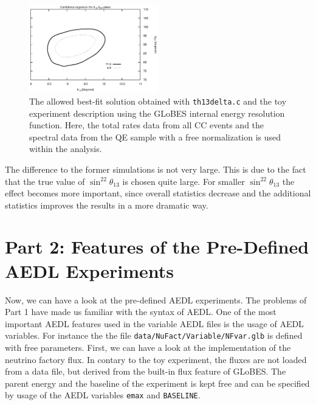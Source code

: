 \documentclass[12pt,a4paper]{article}
\theoremstyle{dotless}
\begin{document}
\begin{figure}[h!]
  \begin{center}
    \includegraphics[width=0.5\textwidth]{CCtotal.eps}   
      \end{center}
  \vspace{-0.7 cm}
  \caption{\small The allowed best-fit solution obtained with {\tt th13delta.c}
  and the toy experiment description using the GLoBES internal energy resolution function.
  Here, the total rates data from all CC events and the spectral data from the QE sample
  with a free normalization is used within the analysis.}
  \label{fig:total}
\end{figure}

The difference to the former simulations is not very large. This is due to the fact that
the true value of $\sin^22\theta_{13}$ is chosen quite large. For smaller $\sin^22\theta_{13}$
the effect becomes more important, since overall statistics decrease and the additional statistics
improves the results in a more dramatic way.

\section*{Part 2: Features of the Pre-Defined AEDL Experiments}

Now, we can have a look at the pre-defined AEDL experiments. The problems of
Part 1 have made us familiar with the syntax of AEDL. One of the most important
AEDL features used in the variable AEDL files is the usage of AEDL variables.
For instance the the file {\tt data/NuFact/Variable/NFvar.glb} is defined with free
parameters. First, we can have a look at the implementation of the neutrino factory
flux. In contary to the toy experiment, the fluxes are not loaded from a data file, but
derived from the built-in flux feature of GLoBES. The parent energy and the baseline of the
experiment is kept free and can be specified by usage of the AEDL variables {\tt emax} and
{\tt BASELINE}.\\
\end{document}
